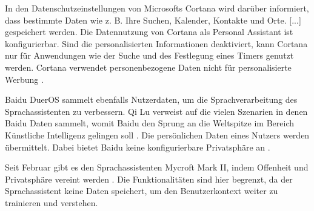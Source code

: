In den Datenschutzeinstellungen von Microsofts Cortana wird darüber informiert, dass bestimmte Daten \glqq [...] wie z. B. Ihre Suchen, Kalender, Kontakte und Orte. [...]\grqq{} gespeichert werden. Die Datennutzung von Cortana als Personal Assistant ist konfigurierbar. Sind die personalisierten Informationen deaktiviert, kann Cortana nur für Anwendungen wie der Suche und des Festlegung eines Timers genutzt werden. Cortana verwendet personenbezogene Daten nicht für personalisierte Werbung \cite{cortanaAssistent}. 

Baidu DuerOS sammelt ebenfalls Nutzerdaten, um die Sprachverarbeitung des Sprachassistenten zu verbessern. Qi Lu verweist auf die vielen Szenarien in denen Baidu Daten sammelt, womit Baidu den Sprung an die Weltspitze im Bereich Künstliche Intelligenz gelingen soll . Die persönlichen Daten eines Nutzers werden übermittelt. Dabei bietet Baidu keine konfigurierbare Privatsphäre an \cite{baiduAI}. 

Seit Februar gibt es den Sprachassistenten Mycroft Mark II, indem Offenheit und Privatsphäre vereint werden \cite{mycroftsmartspeaker}. Die Funktionalitäten sind hier begrenzt, da der Sprachassistent keine Daten speichert, um den Benutzerkontext weiter zu trainieren und verstehen.